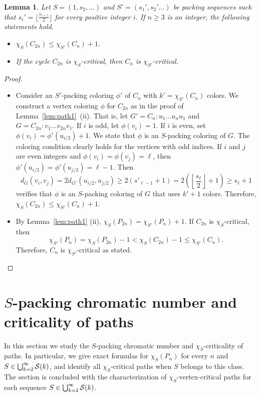\documentclass[12pt]{article}
\newtheorem{lemma}[theorem]{Lemma}
\newcommand{\cS}{{\cal S}}
\begin{document}
\begin{lemma}  \label{lem:cycle}
    Let $S=(1,s_2, \dots)$ and $S'=(s_1', s_2' \dots )$ be packing sequences such that $s_i'=\lfloor \frac{s_{i+1}}{2} \rfloor$ for every positive integer $i$. If $n \ge 3$ is an integer, the following statements hold.
    \begin{itemize}
        \item[(i)] $\chi_S(C_{2n}) \leq \chi_{S'}(C_n) +1 $.
        \item[(ii)] If the cycle $C_{2n}$ is $\chi_S$-critical, then $C_n$ is $\chi_{S'}$-critical.
    \end{itemize}
    \end{lemma}
\begin{proof}
\begin{itemize}

    \item[(i)] Consider an $S'$-packing coloring $\phi'$ of $C_n$ with $k'= \chi_{S'}(C_n)$ colors. We construct a vertex coloring $\phi$ for $C_{2n}$ as in the proof of Lemma~\ref{lem:path1}~(ii). That is, let $G'=C_n\colon u_1\dots u_nu_1$ and $G=C_{2n} \colon v_1 \dots v_{2n}v_1$. If $i$ is odd, let $\phi(v_i)=1$. If $i$ is even, set $\phi(v_i)=\phi'(u_{i/2}) +1$. We state that $\phi$ is an $S$-packing coloring of $G$. The coloring condition clearly holds for the vertices with odd indices. If $i$ and $j$ are even integers and $\phi(v_i)=\phi(v_j)=\ell$, then $\phi'(u_{i/2})= \phi'(u_{j/2})= \ell-1$. Then
    $$d_G(v_i, v_j)= 2 d_{G'}(u_{i/2}, u_{j/2}) \ge 2 (s'_{\ell-1}+1) =  2 \left(\left\lfloor \frac{s_\ell}{2} \right\rfloor +1 \right)\ge s_\ell +1
    $$
    verifies that $\phi$ is an $S$-packing coloring of $G$ that uses $k'+1$ colors. Therefore, $\chi_S(C_{2n}) \leq \chi_{S'}(C_n)+1$. 
    \medskip

    \item[(ii)]  By Lemma~\ref{lem:path1} (ii), $\chi_S(P_{2n})=\chi_{S'}(P_n)+1$. If $C_{2n}$ is $\chi_S$-critical, then
    $$\chi_{S'}(P_n)= \chi_S(P_{2n}) -1 < \chi_S(C_{2n}) -1 \le \chi_{S'}(C_n).
    $$
    Therefore, $C_n$ is $\chi_{S'}$-critical as stated.
    \end{itemize}
\end{proof}

\section{$S$-packing chromatic number and criticality of paths} \label{sec:paths}
In this section we study the $S$-packing chromatic number and $\chi_S$-criticality of paths. In particular, we give exact formulas for $\chi_S(P_n)$ for every $n$ and $S \in \bigcup_{k=2}^\infty \cS(k)$, and identify all $\chi_S$-critical paths when $S$ belongs to this class. The section is concluded with the characterization of $\chi_S$-vertex-critical paths for each sequence $S \in \bigcup_{k=2}^\infty \cS(k)$. 
\end{document}
